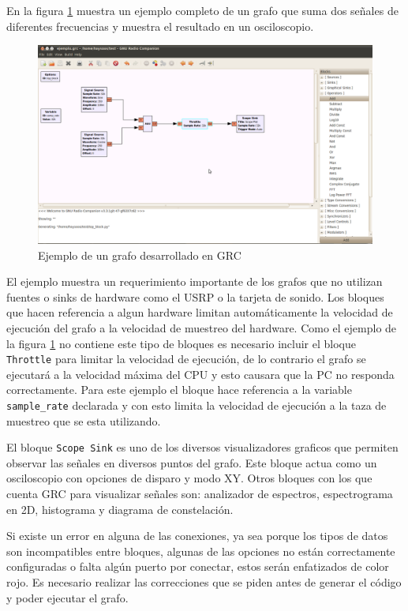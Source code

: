 En la figura \ref{fig:grcex} muestra un ejemplo completo de un grafo que suma dos se\~nales de
diferentes frecuencias y muestra el resultado en un osciloscopio.

\begin{figure}[tp]
  \centering
  \includegraphics[width=5.5in]{figs/grc6}
  \vspace{0.1in}
  \caption{Ejemplo de un grafo desarrollado en GRC}
  \label{fig:grcex}
\end{figure}

El ejemplo muestra un requerimiento importante de los grafos que no utilizan fuentes o sinks de
hardware como el USRP o la tarjeta de sonido. Los bloques que hacen referencia a algun hardware
limitan autom\'aticamente la velocidad de ejecuci\'on del grafo a la velocidad de muestreo del
hardware. Como el ejemplo de la figura \ref{fig:grcex} no contiene este tipo de bloques es
necesario incluir el bloque \verb|Throttle| para limitar la velocidad de ejecuci\'on, de lo
contrario el grafo se ejecutar\'a a la velocidad m\'axima del CPU y esto causara que la PC no
responda correctamente. Para este ejemplo el bloque hace referencia a la variable \verb|sample_rate|
declarada y con esto limita la velocidad de ejecuci\'on a la taza de muestreo que se esta utilizando.

El bloque \verb|Scope Sink| es uno de los diversos visualizadores graficos que permiten observar las
se\~nales en diversos puntos del grafo. Este bloque actua como un osciloscopio con opciones de
disparo y modo XY. Otros bloques con los que cuenta GRC para visualizar se\~nales son: analizador de
espectros, espectrograma en 2D, histograma y diagrama de constelaci\'on.

Si existe un error en alguna de las conexiones, ya sea porque los tipos de datos son incompatibles
entre bloques, algunas de las opciones no est\'an correctamente configuradas o falta alg\'un puerto
por conectar, estos ser\'an enfatizados de color rojo. Es necesario realizar las correcciones que se
piden antes de generar el c\'odigo y poder ejecutar el grafo.

